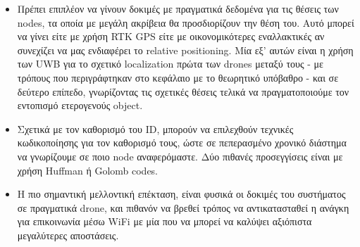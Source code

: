 \begin{itemize}
    \item Πρέπει επιπλέον να γίνουν δοκιμές με πραγματικά δεδομένα για τις θέσεις των nodes, τα οποία με μεγάλη ακρίβεια θα προσδιορίζουν την θέση του. Αυτό μπορεί να γίνει είτε με χρήση RTK GPS είτε με οικονομικότερες εναλλακτικές αν συνεχίζει να μας ενδιαφέρει το relative positioning. Μία εξ' αυτών είναι η χρήση των UWB για το σχετικό localization πρώτα των drones μεταξύ τους - με τρόπους που περιγράφτηκαν στο κεφάλαιο με το θεωρητικό υπόβαθρο - και σε δεύτερο επίπεδο, γνωρίζοντας τις σχετικές θέσεις τελικά να πρα\-γμα\-το\-ποιού\-με τον εντοπισμό ετερογενούς object. 
    \item Σχετικά με τον καθορισμό του ID, μπορούν να επιλεχθούν τεχνικές κω\-δι\-κο\-ποί\-η\-σης για τον καθορισμό τους, ώστε σε πεπερασμένο χρονικό διάστημα να γνωρίζουμε σε ποιο node αναφερόμαστε. Δύο πιθανές προσεγγίσεις είναι με χρήση Huffman ή Golomb codes.
    \item Η πιο σημαντική μελλοντική επέκταση, είναι φυσικά οι δοκιμές του συστήματος σε πραγματικά drone, και πιθανόν να βρεθεί τρόπος να αντικατασταθεί η ανάγκη για επικοινωνία μέσω WiFi με μία που να μπορεί να καλύψει αξιόπιστα μεγαλύτερες αποστάσεις.
  \end{itemize}



